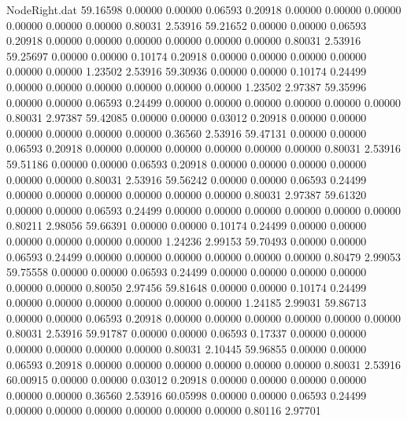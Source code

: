 \begin{filecontents}{NodeRight.dat}
  59.16598    0.00000    0.00000     0.06593    0.20918    0.00000    0.00000    0.00000    0.00000    0.00000    0.00000    0.80031    2.53916
  59.21652    0.00000    0.00000     0.06593    0.20918    0.00000    0.00000    0.00000    0.00000    0.00000    0.00000    0.80031    2.53916
  59.25697    0.00000    0.00000     0.10174    0.20918    0.00000    0.00000    0.00000    0.00000    0.00000    0.00000    1.23502    2.53916
  59.30936    0.00000    0.00000     0.10174    0.24499    0.00000    0.00000    0.00000    0.00000    0.00000    0.00000    1.23502    2.97387
  59.35996    0.00000    0.00000     0.06593    0.24499    0.00000    0.00000    0.00000    0.00000    0.00000    0.00000    0.80031    2.97387
  59.42085    0.00000    0.00000     0.03012    0.20918    0.00000    0.00000    0.00000    0.00000    0.00000    0.00000    0.36560    2.53916
  59.47131    0.00000    0.00000     0.06593    0.20918    0.00000    0.00000    0.00000    0.00000    0.00000    0.00000    0.80031    2.53916
  59.51186    0.00000    0.00000     0.06593    0.20918    0.00000    0.00000    0.00000    0.00000    0.00000    0.00000    0.80031    2.53916
  59.56242    0.00000    0.00000     0.06593    0.24499    0.00000    0.00000    0.00000    0.00000    0.00000    0.00000    0.80031    2.97387
  59.61320    0.00000    0.00000     0.06593    0.24499    0.00000    0.00000    0.00000    0.00000    0.00000    0.00000    0.80211    2.98056
  59.66391    0.00000    0.00000     0.10174    0.24499    0.00000    0.00000    0.00000    0.00000    0.00000    0.00000    1.24236    2.99153
  59.70493    0.00000    0.00000     0.06593    0.24499    0.00000    0.00000    0.00000    0.00000    0.00000    0.00000    0.80479    2.99053
  59.75558    0.00000    0.00000     0.06593    0.24499    0.00000    0.00000    0.00000    0.00000    0.00000    0.00000    0.80050    2.97456
  59.81648    0.00000    0.00000     0.10174    0.24499    0.00000    0.00000    0.00000    0.00000    0.00000    0.00000    1.24185    2.99031
  59.86713    0.00000    0.00000     0.06593    0.20918    0.00000    0.00000    0.00000    0.00000    0.00000    0.00000    0.80031    2.53916
  59.91787    0.00000    0.00000     0.06593    0.17337    0.00000    0.00000    0.00000    0.00000    0.00000    0.00000    0.80031    2.10445
  59.96855    0.00000    0.00000     0.06593    0.20918    0.00000    0.00000    0.00000    0.00000    0.00000    0.00000    0.80031    2.53916
  60.00915    0.00000    0.00000     0.03012    0.20918    0.00000    0.00000    0.00000    0.00000    0.00000    0.00000    0.36560    2.53916
  60.05998    0.00000    0.00000     0.06593    0.24499    0.00000    0.00000    0.00000    0.00000    0.00000    0.00000    0.80116    2.97701

\end{filecontents}
